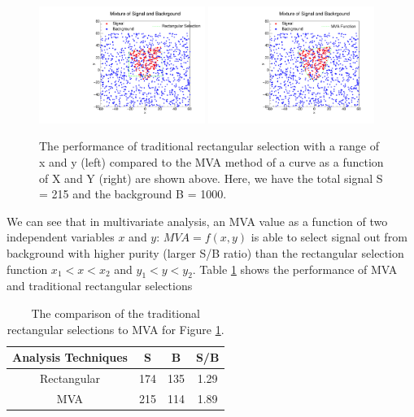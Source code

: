 \begin{figure}[h]
\begin{center}
\includegraphics[width= 0.48\textwidth]{Figures/Chapter5/Rectangular.pdf}
\includegraphics[width= 0.48\textwidth]{Figures/Chapter5/MVA.pdf}
\caption{The performance of traditional rectangular selection with a range of x and y (left) compared to the MVA method of a curve as a function of X and Y (right) are shown above. Here, we have the total signal S = 215 and the background B =  1000.}
\label{MVADemo}
\end{center}
\end{figure}

We can see that in multivariate analysis, an MVA value as a function of two independent variables $x$ and $y$: $MVA = f(x,y)$ is able to select signal out from background with higher purity (larger S/B ratio) than the rectangular selection function $x_1 < x < x_2$ and $y_1 < y < y_2$. Table \ref{MVAvsRec} shows the performance of MVA and traditional rectangular selections

\begin{table}[h]
\begin{center}
\caption{The comparison of the traditional rectangular selections to MVA for Figure \ref{MVADemo}.}
\vspace{1em}
\label{MVAvsRec}
  \begin{tabular}{ |c | c| c| c|}
    \hline 
Analysis Techniques &  S & B & S/B \\
     \hline
Rectangular & 174 & 135 & 1.29  \\
         \hline
MVA &   215  & 114  & 1.89  \\
     \hline
    \hline
\end{tabular}
\end{center}
\end{table}


